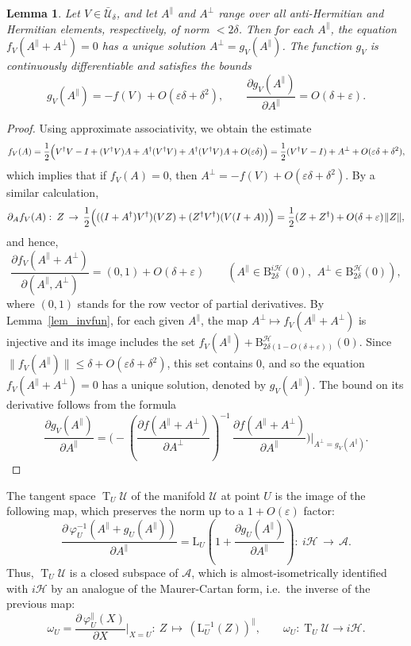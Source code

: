 \documentclass[12pt]{article}
\newcommand{\calA}{\mathcal{A}}
\newcommand{\calH}{\mathcal{H}}
\newcommand{\calU}{\mathcal{U}}
\newcommand{\ts}{\mkern1mu}
\DeclareMathOperator{\Ta}{T}
\newcommand{\Ba}{\mathrm{B}}
\newcommand{\La}{\mathrm{L}}
\newcommand{\eps}{\varepsilon}
\newcommand{\ph}{\varphi}
\renewcommand{\le}{\leqslant}
\newtheorem{Lemma}[Theorem]{Lemma}
\newtheorem[definition]{Definition}[Theorem]{Definition}
\newtheorem[remark]{Example}[Theorem]{Example}
\newtheorem[remark]{Remark}[Theorem]{Remark}
\newtheorem[remark]{Question}[Theorem]{Open question}
\newtheorem*[definition]{definition}{Definition}
\newtheorem*[remark]{example}{Example}
\newtheorem*[remark]{remark}{Remark}
\newtheorem*[remark]{question}{Open question}
\numberwithin{equation}{section}
\begin{document}
\begin{Lemma}\label{lem_gV}
Let $V\in\bar{\calU}_\delta$, and let $A^\parallel$ and $A^\perp$ range over all anti-Hermitian and Hermitian elements, respectively, of norm $<2\delta$. Then for each $A^\parallel$, the equation $f_V(A^\parallel+A^\perp)=0$ has a unique solution $A^\perp=g_V(A^\parallel)$. The function $g_V$ is continuously differentiable and satisfies the bounds
\begin{equation}
g_V(A^\parallel)=-f(V)+O(\eps\delta+\delta^2),\qquad
\frac{\partial g_V(A^\parallel)}{\partial A^\parallel} = O(\delta+\eps).
\end{equation}
\end{Lemma}
\begin{proof}
Using approximate associativity, we obtain the estimate
\[
f_V(A)=\frac{1}{2}\Bigl(V^{\dag}V-I
+(V^{\dag}V)A+A^{\dag}(V^{\dag}V)+A^{\dag}(V^{\dag}V)A+O(\eps\delta)\Bigr)
=\frac{1}{2}(V^{\dag}V-I)+A^\perp+O(\eps\delta+\delta^2),
\]
which implies that if $f_V(A)=0$, then $A^\perp=-f(V)+O(\eps\delta+\delta^2)$. By a similar calculation,
\[
\partial_{A}f_V(A):\: Z\,\to\, \frac{1}{2}
\Bigl(((I+A^\dag)V^{\dag})(VZ)+(Z^\dag V^\dag)(V(I+A))\Bigr)
=\frac{1}{2}(Z+Z^\dag)+O(\delta+\eps)\ts\|Z\|,
\]
and hence,
\[
\frac{\partial f_V(A^\parallel+A^\perp)}{\partial(A^\parallel,A^\perp)}
=(0,1)+O(\delta+\eps)\qquad
(A^\parallel\in\Ba^{i\calH}_{2\delta}(0),\:\,
A^\perp\in\Ba^{\calH}_{2\delta}(0)),
\]
where $(0,1)$ stands for the row vector of partial derivatives. By Lemma~\ref{lem_invfun}, for each given $A^\parallel$, the map $A^\perp\mapsto f_V(A^\parallel+A^\perp)$ is injective and its image includes the set $f_V(A^\parallel)+\Ba^\calH_{2\delta(1-O(\delta+\eps))}(0)$. Since $\|f_V(A^\parallel)\|\le \delta+O(\eps\delta+\delta^2)$, this set contains $0$, and so the equation $f_V(A^\parallel+A^\perp)=0$ has a unique solution, denoted by $g_V(A^\parallel)$. The bound on its derivative follows from the formula
\[
\frac{\partial g_V(A^\parallel)}{\partial A^\parallel}
=\biggl(-\left(\frac{\partial f(A^\parallel+A^\perp)}
{\partial A^\perp}\right)^{-1}\,
\frac{\partial f(A^\parallel+A^\perp)}
{\partial A^\parallel}\biggr)\bigg|_{A^\perp=g_V(A^\parallel)}.
\]
\end{proof}

The tangent space $\Ta_U\calU$ of the manifold $\calU$ at point $U$ is the image of the following map, which preserves the norm up to a $1+O(\eps)$ factor:
\begin{equation}
\frac{\partial\,\ph_U^{-1}(A^\parallel+g_U(A^\parallel))}{\partial A^\parallel}
=\La_U\left(1+\frac{\partial g_U(A^\parallel)}{\partial A^\parallel}\right):\:
i\calH\,\to\,\calA.
\end{equation}
Thus, $\Ta_U\calU$ is a closed subspace of $\calA$, which is almost-isometrically identified with $i\calH$ by an analogue of the Maurer-Cartan form, i.e.\ the inverse of the previous map:
\begin{equation}\label{MC_form}
\omega_U=\frac{\partial\,\ph_U^\parallel(X)}{\partial X}\bigg|_{X=U}
\colon\: Z\,\mapsto\, (\La_U^{-1}(Z))^\parallel,\qquad
\omega_U\colon \Ta_U\calU\to i\calH.
\end{equation}
\end{document}
